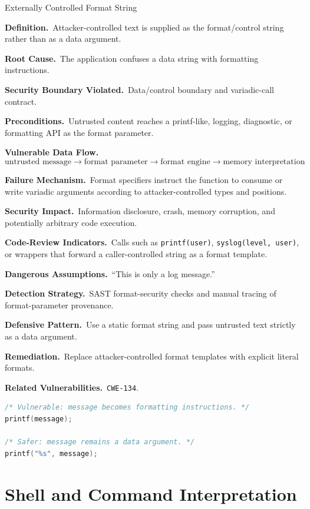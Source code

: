 \documentclass[11pt]{article}
\newcommand{\field}[1]{\par\smallskip\noindent\textbf{#1.}\ }
\newcommand{\cwe}[1]{\texttt{#1}}
\begin{document}
\begin{catalogbox}{Externally Controlled Format String}
\field{Definition}Attacker-controlled text is supplied as the format/control string rather than as a data argument.

\field{Root Cause}The application confuses a data string with formatting instructions.

\field{Security Boundary Violated}Data/control boundary and variadic-call contract.

\field{Preconditions}Untrusted content reaches a printf-like, logging, diagnostic, or formatting API as the format parameter.

\field{Vulnerable Data Flow}
\[
\text{untrusted message} \rightarrow \text{format parameter}
\rightarrow \text{format engine} \rightarrow \text{memory interpretation}
\]

\field{Failure Mechanism}Format specifiers instruct the function to consume or write variadic arguments according to attacker-controlled types and positions.

\field{Security Impact}Information disclosure, crash, memory corruption, and potentially arbitrary code execution.

\field{Code-Review Indicators}Calls such as \texttt{printf(user)}, \texttt{syslog(level, user)}, or wrappers that forward a caller-controlled string as a format template.

\field{Dangerous Assumptions}``This is only a log message.''

\field{Detection Strategy}SAST format-security checks and manual tracing of format-parameter provenance.

\field{Defensive Pattern}Use a static format string and pass untrusted text strictly as a data argument.

\field{Remediation}Replace attacker-controlled format templates with explicit literal formats.

\field{Related Vulnerabilities}\cwe{CWE-134}.
\end{catalogbox}

\begin{lstlisting}[language=C,caption={Format string: unsafe versus safer data/control separation}]
/* Vulnerable: message becomes formatting instructions. */
printf(message);

/* Safer: message remains a data argument. */
printf("%s", message);
\end{lstlisting}

\section{Shell and Command Interpretation}
\end{document}

